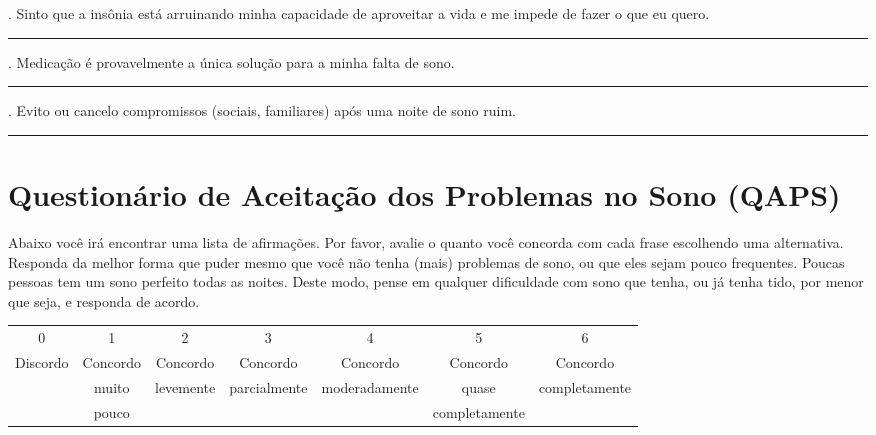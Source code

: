 \documentclass[
  ,doc,11pt, twoside,floatsintext]{apa6}
\begin{document}
\begin{appendix}
\begin{flushleft}
{.	Sinto que a insônia está arruinando minha capacidade de aproveitar a vida e me impede de fazer o que eu quero. 
\medskip
\hrule
\medskip
\hspace*{6mm} \par

.	Medicação é provavelmente a única solução para a minha falta de sono.  
\medskip
\hrule
\medskip
\hspace*{6mm} \par

.	Evito ou cancelo compromissos (sociais, familiares) após uma noite de sono ruim.
\medskip
\hrule
\medskip
\hspace*{6mm} \par
}

\end{flushleft}

\section{Questionário de Aceitação dos Problemas no Sono (QAPS)}
\label{qaps}

Abaixo você irá encontrar uma lista de afirmações. Por favor, avalie o quanto você concorda com cada frase escolhendo uma alternativa. Responda da melhor forma que puder mesmo que você não tenha (mais) problemas de sono, ou que eles sejam pouco frequentes. Poucas pessoas tem um sono perfeito todas as noites. Deste modo, pense em qualquer dificuldade com sono que tenha, ou já tenha tido, por menor que seja, e responda de acordo.

\begin{table}[h]
\begin{tabular}{ccccccc}
0 & 1 & 2 & 3 & 4 & 5 & 6 \\
Discordo & Concordo & Concordo & Concordo & Concordo & Concordo & Concordo \\
 & muito & levemente & parcialmente & moderadamente & quase & completamente \\
 & pouco &  &  &  & completamente & 
\end{tabular}
\end{table}


\end{appendix}
\end{document}
